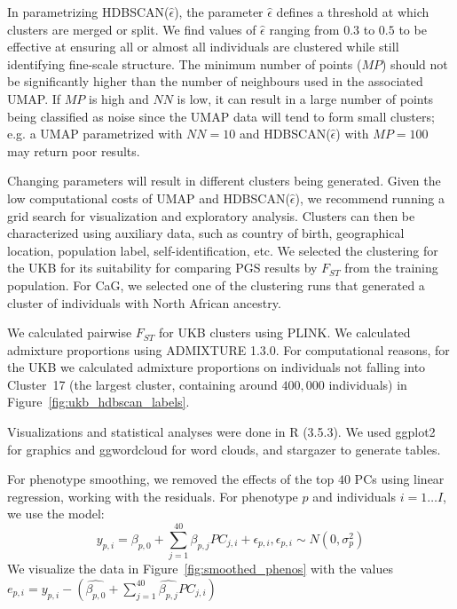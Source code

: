 In parametrizing HDBSCAN($\hat{\epsilon}$), the parameter $\hat{\epsilon}$ defines a threshold at which clusters are merged or split. We find values of $\hat{\epsilon}$ ranging from $0.3$ to $0.5$ to be effective at ensuring all or almost all individuals are clustered while still identifying fine-scale structure. The minimum number of points ($MP$) should not be significantly higher than the number of neighbours used in the associated UMAP. If $MP$ is high and $NN$ is low, it can result in a large number of points being classified as noise since the UMAP data will tend to form small clusters; e.g. a UMAP parametrized with $NN=10$ and HDBSCAN($\hat{\epsilon}$) with $MP=100$ may return poor results.

Changing parameters will result in different clusters being generated. Given the low computational costs of UMAP and HDBSCAN($\hat{\epsilon}$), we recommend running a grid search for visualization and exploratory analysis. Clusters can then be characterized using auxiliary data, such as country of birth, geographical location, population label, self-identification, etc. We selected the clustering for the UKB for its suitability for comparing PGS results by $F_{ST}$ from the training population. For CaG, we selected one of the clustering runs that generated a cluster of individuals with North African ancestry.

We calculated pairwise $F_{ST}$ for UKB clusters using PLINK\citep{purcell_plink_2007}. We calculated admixture proportions using ADMIXTURE 1.3.0\citep{alexander_fast_2009}. For computational reasons, for the UKB we calculated admixture proportions on individuals not falling into Cluster~17 (the largest cluster, containing around $400,000$ individuals) in Figure~\ref{fig:ukb_hdbscan_labels}.

Visualizations and statistical analyses were done in R (3.5.3)\citep{r_2018}. We used ggplot2\citep{wickham_2016} for graphics and ggwordcloud for word clouds, and stargazer\citep{Hlavac2018-fy} to generate tables.

For phenotype smoothing, we removed the effects of the top $40$ PCs using linear regression, working with the residuals. For phenotype $p$ and individuals $i=1 \dots I$, we use the model:
$$ y_{p,i} = \beta_{p,0} + \sum_{j=1}^{40}\beta_{p,j}PC_{j,i} + \epsilon_{p,i},  \epsilon_{p,i} \sim N(0,\sigma^2_{p}) $$
We visualize the data in Figure~\ref{fig:smoothed_phenos} with the values $ e_{p,i} = y_{p,i} - (\hat{\beta_{p,0}} + \sum_{j=1}^{40}\hat{\beta_{p,j}}PC_{j,i}) $



\clearpage

\makeatletter
\renewcommand\thetable{\@arabic\c@chapter s\@arabic\c@table}
\renewcommand \thefigure{\@arabic\c@chapter s\@arabic\c@figure}
\makeatother

\setcounter{figure}{0}  
\setcounter{table}{0}



\clearpage